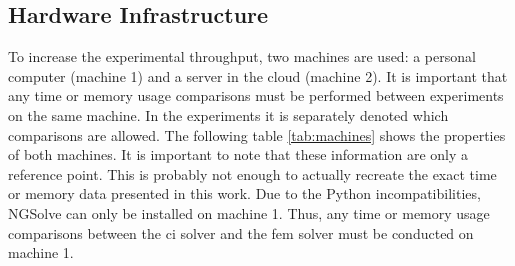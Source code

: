 \documentclass[./\jobname.tex]{subfiles}
\begin{document}
\subsection{Hardware Infrastructure}
\label{chap:hardware_setup}
To increase the experimental throughput, two machines are used: a personal computer (machine 1) and a server in the cloud (machine 2). It is important that any time or memory usage comparisons must be performed between experiments on the same machine. In the experiments it is separately denoted which comparisons are allowed. The following table \ref{tab:machines} shows the properties of both machines. It is important to note that these information are only a reference point. This is probably not enough to actually recreate the exact time or memory data presented in this work. Due to the Python incompatibilities, NGSolve can only be installed on machine 1. Thus, any time or memory usage comparisons between the \gls{ci} solver and the \gls{fem} solver must be conducted on machine 1. 
\begin{table}[H]
	\centering
	\noindent{}
	\label{tab:machines}
\end{table}
\end{document}
